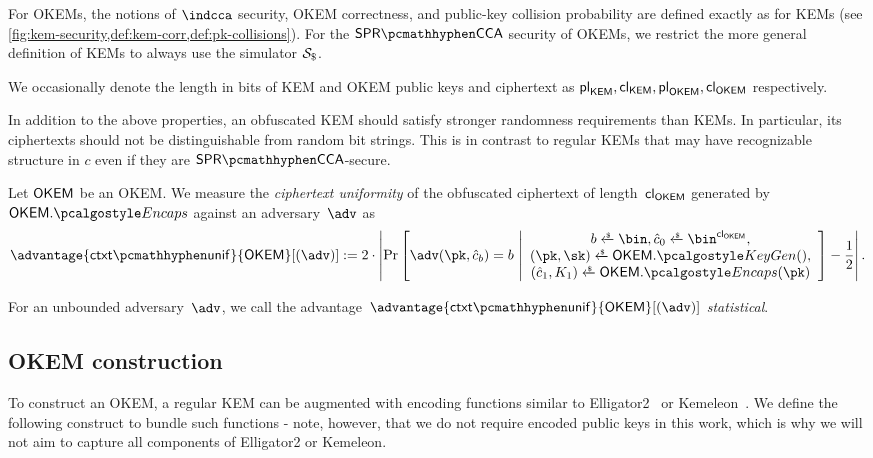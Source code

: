 For OKEMs, the notions of $\indcca$ security, OKEM correctness, and public-key collision probability are defined exactly as for KEMs (see \cref{fig:kem-security,def:kem-corr,def:pk-collisions}). For the $\sprcca$ security of OKEMs, we restrict the more general definition of KEMs to always use the simulator $\simulbin$.

We occasionally denote the length in bits of KEM and OKEM public keys and ciphertext as $\mathsf{pl}_{\mathsf{KEM}}, \mathsf{cl}_{\mathsf{KEM}}, \mathsf{pl}_{\mathsf{OKEM}}, \mathsf{cl}_{\mathsf{OKEM}}$ respectively.

In addition to the above properties, an obfuscated KEM should satisfy stronger randomness requirements than KEMs. In particular, its ciphertexts should not be distinguishable from random bit strings. This is in contrast to regular KEMs that may have recognizable structure in $c$ even if they are $\sprcca$-secure.

\begin{definition}
\label{def:ctxt-uniformity}
    Let $\mathsf{OKEM}$ be an OKEM.
    We measure the \emph{ciphertext uniformity} of the obfuscated ciphertext of length~$\mathsf{cl}_{\mathsf{OKEM}}$ generated by $\OKEM.\encaps$ against an adversary~$\adv$ as
    \[
        \advantage{\ctxtunif}{\OKEM}[(\adv)] := 
        2 \cdot \left|
        \Pr\left[
            \adv(\pk, \hat c_b) = b
        ~\middle|
            \begin{array}{c}
                b \getsr \bin, \hat c_0 \getsr \bin^{\obfctxtlen}, \\
                (\pk,\sk) \getsr \OKEM.\kgen(),\\
                (\hat c_1, K_1) \getsr \OKEM.\encaps(\pk)
            \end{array}
        \right]
        - \frac{1}{2}
        \right|.
    \]
    
    For an unbounded adversary~$\adv$, we call the advantage~$\advantage{\ctxtunif}{\OKEM}[(\adv)] $ \emph{statistical}.
\end{definition}

\subsection{OKEM construction}

To construct an OKEM, a regular KEM can be augmented with encoding functions similar to \textsf{Elligator2}~\cite{CCS:BHKL13} or \textsf{Kemeleon}~\cite[Sec. 2.4]{CCS:GunSteVei24}. We define the following construct to bundle such functions - note, however, that we do not require encoded public keys in this work, which is why we will not aim to capture all components of \textsf{Elligator2} or \textsf{Kemeleon}. 

